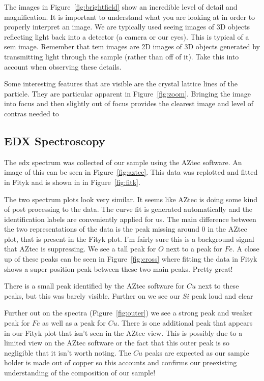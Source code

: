 \documentclass[12pt,a4paper]{article}
\begin{document}
The images in Figure~\ref{fig:brightfield} show an incredible level of detail and magnification.  It is important to understand what you are looking at in order to properly interpret an image.  We are typically used seeing images of 3D objects reflecting light back into a detector (a camera or our eyes).  This is typical of a \ac{sem} image.  Remember that \ac{tem} images are 2D images of 3D objects generated by transmitting light through the sample (rather than off of it).  Take this into account when observing these details.

Some interesting features that are visible are the crystal lattice lines of the particle.  They are particular apparent in Figure~\ref{fig:zoom}.  Bringing the image into focus and then slightly out of focus provides the clearest image and level of contras needed to 


\subsection{EDX Spectroscopy} %
\label{sub:edx_spectroscopy}

The \ac{edx} spectrum was collected of our sample using the AZtec software.  An image of this can be seen in Figure~\ref{fig:aztec}.  This data was replotted and fitted in Fityk and is shown in in Figure~\ref{fig:fitk}.  

The two spectrum plots look very similar.  It seems like AZtec is doing some kind of post processing to the data.  The curve fit is generated automatically and the identification labels are conveniently applied for us.  The main difference between the two representations of the data is the peak missing around 0 in the AZtec plot, that is present in the Fityk plot.  I'm fairly sure this is a background signal that AZtec is suppressing.  We see a tall peak for $O$ next to a peak for $Fe$.  A close up of these peaks can be seen in Figure~\ref{fig:cross} where fitting the data in Fityk shows a super position peak between these two main peaks.  Pretty great!  

There is a small peak identified by the AZtec software for $Cu$ next to these peaks, but this was barely visible.  Further on we see our $Si$ peak loud and clear

Further out on the spectra (Figure~\ref{fig:outer}) we see a strong peak and weaker peak for $Fe$ as well as a peak for $Cu$.  There is one additional peak that appears in our Fityk plot that isn't seen in the AZtec view.  This is possibly due to a limited view on the AZtec software or the fact that this outer peak is so negligible that it isn't worth noting.  The $Cu$ peaks are expected as our sample holder is made out of copper so this accounts and confirms our preexisting understanding of the composition of our sample!
\end{document}
